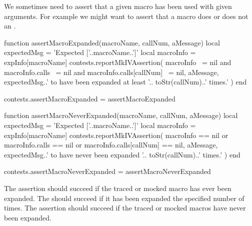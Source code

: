 \stopTestSuite


We sometimes need to assert that a given macro has been used with given 
arguments. For example we might want to assert that a macro does or does 
not  an \type{\errmessage}.

\startMkIVCode
\def\assertMacroExpanded#1#2{%
  \directlua{%
    thirddata.contests.assertMacroExpanded('#1', 1, '#2')
  }
}

\def\assertMacroNeverExpanded#1#2{%
  \directlua{%
    thirddata.contests.assertMacroNeverExpanded('#1', 1, '#2')
  }
}

\def\assertMacroExpandedNTimes#1#2#3{%
  \directlua{%
    thirddata.contests.assertMacroExpanded('#1', #2, '#3')
  }
}

\def\assertMacroNeverExpandedNTimes#1#2#3{%
  \directlua{%
    thirddata.contests.assertMacroNeverExpanded('#1', #2, '#3')
  }
}
\stopMkIVCode

\startLuaCode
function assertMacroExpanded(macroName, callNum, aMessage)
  local expectedMsg = 'Expected ['..macroName..']'
  local macroInfo   = expInfo[macroName]
  contests.reportMkIVAssertion(
    macroInfo ~= nil
    and macroInfo.calls ~= nil
    and macroInfo.calls[callNum] ~= nil,
    aMessage,
    expectedMsg..' to have been expanded at least '..
      toStr(callNum)..' times.'
  )
end

contests.assertMacroExpanded = assertMacroExpanded

function assertMacroNeverExpanded(macroName, callNum, aMessage)
  local expectedMsg = 'Expected ['..macroName..']'
  local macroInfo   = expInfo[macroName]
  contests.reportMkIVAssertion(
    macroInfo == nil
    or macroInfo.calls == nil
    or macroInfo.calls[callNum] == nil,
    aMessage,
    expectedMsg..' to have never been expanded '..
      toStr(callNum)..' times.'
  )
end

contests.assertMacroNeverExpanded = assertMacroNeverExpanded
\stopLuaCode


The \type{\assertMacroExpanded} assertion should succeed if the traced or 
mocked macro has ever been expanded. The \type{\assertMacroExpandedNTimes} 
should succeed if it has been expanded the specified number of times. The 
\type{\assertMacroeverExpanded} assertion should succeed if the traced or 
mocked macros have never been expanded. 

